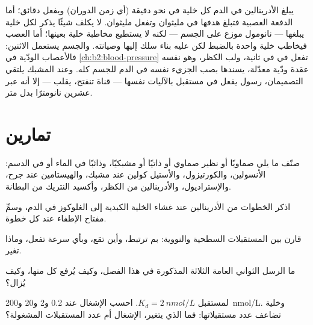 \begin{example}\label{ex:b2:cell-signalling:compare}
يبلغ الأدرينالين في الدم كل خلية في نحو دقيقة
(أي زمن الدوران) ويفعل دقائق؛ أما الدفعة العصبية
فتبلغ هدفها في مليثوان وتفعل مليثوان. 
لا يكلف شيئًا يذكر لكل خلية يبلغها --- نانومول موزع
على الجسم --- لكنه لا يستطيع مخاطبة خلية بعينها؛ أما العصب فيخاطب
خلية واحدة بالضبط لكن عليه بناء سلك إليها وصيانته. والجسم يستعمل
الاثنين: فالأعصاب الودّية في \cref{ch:b2:blood-pressure} تفعل في
  في ثانية، ولب الكظر،
وهو نفسه عقدة ودّية معدّلة، يسندها بصب
الجزيء نفسه في الدم للجسم كله. وعند المشبك
يلتقي التصميمان،  رسول يفعل
في مستقبل بالآليات نفسها --- قناة تنفتح، 
يقلب --- إلا أنه عبر عشرين نانومترًا بدل
متر.
\end{example}

\section{تمارين}

\begin{exercise}[$\star$]\label{exo:b2:cell-signalling:1}
صنّف ما يلي صماويًا أو نظير صماوي أو ذاتيًا أو مشبكيًا، وذائبًا
في الماء أو في الدسم: الأنسولين، والكورتيزول، والأستيل كولين عند
مشبك، والهيستامين عند جرح، والإستراديول، والأدرينالين من
الكظر، وأكسيد النتريك من البطانة.
\end{exercise}

\begin{exercise}[$\star$]\label{exo:b2:cell-signalling:2}
اذكر الخطوات من الأدرينالين عند غشاء الخلية الكبدية إلى الغلوكوز
في الدم، وسمِّ مفتاح الإطفاء عند كل خطوة.
\end{exercise}

\begin{exercise}[$\star$]\label{exo:b2:cell-signalling:3}
قارن بين المستقبلات السطحية والنووية: بم ترتبط، وأين
تقع، وبأي سرعة تفعل، وماذا تغير.
\end{exercise}

\begin{exercise}[$\star$]\label{exo:b2:cell-signalling:4}
ما الرسل الثواني العامة الثلاثة المذكورة في هذا
الفصل، وكيف يُرفع كل منها، وكيف يُزال؟
\end{exercise}

\begin{exercise}[$\star\star$]\label{exo:b2:cell-signalling:5}
لمستقبل $K_d = \qty{2}{nmol/L}$. احسب الإشغال عند
0.2 و2 و20 و\qty{200}{nmol/L}. وخلية تضاعف عدد مستقبلاتها:
فما الذي يتغير، الإشغال أم عدد المستقبلات المشغولة؟
\end{exercise}

